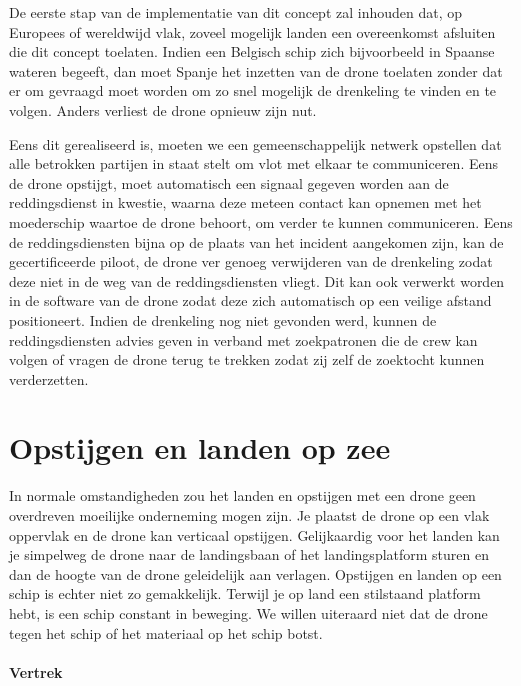 De eerste stap van de implementatie van dit concept zal inhouden dat, op Europees of wereldwijd vlak, zoveel mogelijk landen een overeenkomst afsluiten die dit concept toelaten. Indien een Belgisch schip zich bijvoorbeeld in Spaanse wateren begeeft, dan moet Spanje het inzetten van de drone toelaten zonder dat er om gevraagd moet worden om zo snel mogelijk de drenkeling te vinden en te volgen. Anders verliest de drone opnieuw zijn nut.

Eens dit gerealiseerd is, moeten we een gemeenschappelijk netwerk opstellen dat alle betrokken partijen in staat stelt om vlot met elkaar te communiceren. Eens de drone opstijgt, moet automatisch een signaal gegeven worden aan de reddingsdienst in kwestie, waarna deze meteen contact kan opnemen met het moederschip waartoe de drone behoort, om verder te kunnen communiceren. Eens de reddingsdiensten bijna op de plaats van het incident aangekomen zijn, kan de gecertificeerde piloot, de drone ver genoeg verwijderen van de drenkeling zodat deze niet in de weg van de reddingsdiensten vliegt. Dit kan ook verwerkt worden in de software van de drone zodat deze zich automatisch op een veilige afstand positioneert. Indien de drenkeling nog niet gevonden werd, kunnen de reddingsdiensten advies geven in verband met zoekpatronen die de crew kan volgen of vragen de drone terug te trekken zodat zij zelf de zoektocht kunnen verderzetten.

\newpage

\section{Opstijgen en landen op zee}

In normale omstandigheden zou het landen en opstijgen met een drone geen overdreven moeilijke onderneming mogen zijn. Je plaatst de drone op een vlak oppervlak en de drone kan verticaal opstijgen. Gelijkaardig voor het landen kan je simpelweg de drone naar de landingsbaan of het landingsplatform sturen en dan de hoogte van de drone geleidelijk aan verlagen. Opstijgen en landen op een schip is echter niet zo gemakkelijk. Terwijl je op land een stilstaand platform hebt, is een schip constant in beweging. We willen uiteraard niet dat de drone tegen het schip of het materiaal op het schip botst. 

\paragraph{Vertrek}


